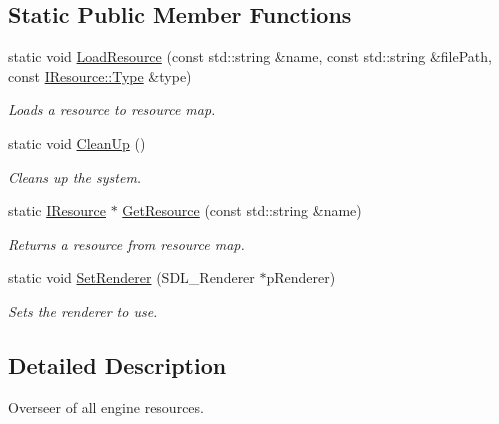 \subsection*{Static Public Member Functions}
\begin{DoxyCompactItemize}
\item 
static void \mbox{\hyperlink{class_resource_system_ac4a4f93f639f85ed01f6482343cf22bf}{Load\+Resource}} (const std\+::string \&name, const std\+::string \&file\+Path, const \mbox{\hyperlink{class_i_resource_a693b751055bf043ebcd424a89831397f}{I\+Resource\+::\+Type}} \&type)
\begin{DoxyCompactList}\small\item\em Loads a resource to resource map. \end{DoxyCompactList}\item 
\mbox{\label{class_resource_system_a0c623d474660a64ba10e2ae16697430c}} 
static void \mbox{\hyperlink{class_resource_system_a0c623d474660a64ba10e2ae16697430c}{Clean\+Up}} ()
\begin{DoxyCompactList}\small\item\em Cleans up the system. \end{DoxyCompactList}\item 
static \mbox{\hyperlink{class_i_resource}{I\+Resource}} $\ast$ \mbox{\hyperlink{class_resource_system_a6cdcecb56a3f7131836b16d2afd10aa7}{Get\+Resource}} (const std\+::string \&name)
\begin{DoxyCompactList}\small\item\em Returns a resource from resource map. \end{DoxyCompactList}\item 
\mbox{\label{class_resource_system_ae6b48360c28a728a2e619343ac410505}} 
static void \mbox{\hyperlink{class_resource_system_ae6b48360c28a728a2e619343ac410505}{Set\+Renderer}} (S\+D\+L\+\_\+\+Renderer $\ast$p\+Renderer)
\begin{DoxyCompactList}\small\item\em Sets the renderer to use. \end{DoxyCompactList}\end{DoxyCompactItemize}


\subsection{Detailed Description}
Overseer of all engine resources. 

